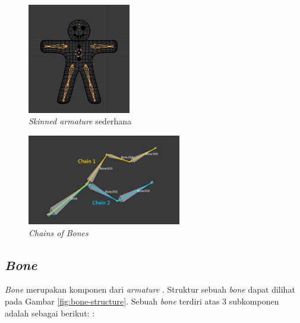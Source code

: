 \setcounter{section}{1}
\begin{figure}[ht]
    \centering
    \includegraphics[width=0.4\textwidth]{resources/chapter-2-basic-armature.png}
    \caption{\textit{Skinned armature} sederhana \parencite{blender-armature-structure}}
    \label{fig:basic-armature}
\end{figure}

\begin{figure}[ht]
    \centering
    \includegraphics[width=0.6\textwidth]{resources/chapter-2-chain-of-bones.png}
    \caption{\textit{Chains of Bones} \parencite{blender-armature-structure}}
    \label{fig:chains-of-bones}
\end{figure}

\subsection{\textit{Bone}}

\textit{Bone} merupakan komponen dari \textit{armature}
\parencite{blender-bones-introduction}. Struktur sebuah \textit{bone} dapat
dilihat pada Gambar \ref{fig:bone-structure}. Sebuah \textit{bone} terdiri atas
3 subkomponen adalah sebagai berikut:
\parencite{blender-bones-structure,blender-glossary}:

